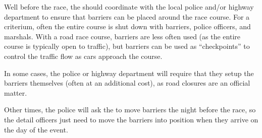 Well before the race, the  should coordinate with the local police and/or highway department
to ensure that barriers can be placed around the race course.
For a criterium, often the entire course is shut down with barriers, police officers, and marshals.
With a road race course, barriers are less often used (as the entire course is typically open to traffic), but barriers can be used
as ``checkpoints'' to control the traffic flow as cars approach the course.

In some cases, the police or highway department will require that they setup the barriers themselves (often at an additional cost),
as road closures are an official matter.

Other times, the police will ask the  to move barriers the night before the race,
so the detail officers just need to move the barriers into position when they arrive on the day of the event.
